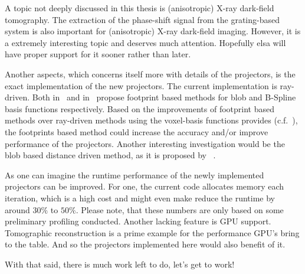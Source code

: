 A topic not deeply discussed in this thesis is (anisotropic) X-ray dark-field tomography. The
extraction of the phase-shift signal from the grating-based system is also important for
(anisotropic) X-ray dark-field imaging. However, it is a extremely interesting topic and deserves
much attention. Hopefully elsa will have proper support for it sooner rather than later.

Another aspects, which concerns itself more with details of the projectors, is the exact
implementation of the new projectors. The current implementation is ray-driven. Both
\citeauthor*{kohler_iterative_2011} in~\cite{kohler_iterative_2011} and
\citeauthor*{momey_spline_2015} in~\cite{momey_spline_2015} propose footprint based methods for blob
and B-Spline basis functions respectively. Based on the improvements of footprint based methods over
ray-driven methods using the voxel-basis functions provides (c.f.\ \cite{long_3d_2010}), the
footprints based method could increase the accuracy and/or improve performance of the projectors.
Another interesting investigation would be the blob based distance driven method, as it is proposed
by \citeauthor*{levakhina_distance-driven_2010}~\cite{levakhina_distance-driven_2010}.

As one can imagine the runtime performance of the newly implemented projectors can be improved. For
one, the current code allocates memory each iteration, which is a high cost and might even make
reduce the runtime by around \(30\%\) to \(50\%\). Please note, that these numbers are only based on
some preliminary profiling conducted. Another lacking feature is GPU support. Tomographic
reconstruction is a prime example for the performance GPU's bring to the table. And so the
projectors implemented here would also benefit of it.

\begin{flushright}
	With that said, there is much work left to do, let's get to work!
\end{flushright}
